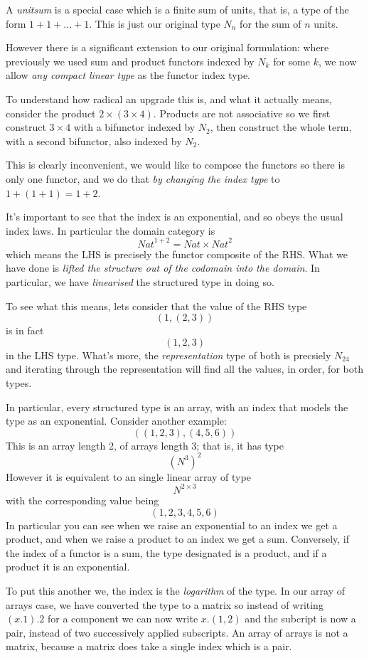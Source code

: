 \documentclass[oneside]{book}
\theoremstyle{plain}
\theoremstyle{definition}
\theoremstyle{plain}
\def\Nat{\mathit{Nat}}
\begin{document}
A {\em unitsum} is a special case which is a finite sum of units,
that is, a type of the form $1+1+...+1$. This is just our
original type $N_n$ for the sum of $n$ units.

However there is a significant extension to our original formulation:
where previously we used sum and product functors indexed by
$N_k$ for some $k$, we now allow {\em any compact linear type}
as the functor index type.

To understand how radical an upgrade this is, and what it actually
means, consider the product $2 \times (3 \times 4)$. Products are
not associative so we first construct $3\times4$ with a bifunctor
indexed by $N_2$, then construct the whole term, with a second
bifunctor, also indexed by $N_2$.

This is clearly inconvenient, we would like to compose the functors
so there is only one functor, and we do that {\em by changing
the index type} to $1+(1+1) = 1 + 2$.

It's important to see that the index is an exponential, and so obeys the
usual index laws. In particular the domain category is
$$\Nat^{1+2} = \Nat \times {\Nat^2}$$
which means the LHS is precisely the functor composite of the RHS.
What we have done is {\em lifted the structure out of the codomain
into the domain}. In particular, we have {\em linearised} the
structured type in doing so.

To see what this means, lets consider that the value of the RHS type
$$(1,(2,3))$$
is in fact
$$(1,2,3)$$
in the LHS type. What's more, the {\em representation} type of both
is precsiely $N_{24}$ and iterating through the representation will
find all the values, in order, for both types.

In particular, every structured type is an array, with an index
that models the type as an exponential. Consider another example:
$$((1,2,3),(4,5,6))$$
This is an array length 2, of arrays length 3; that is, it has type
$$(N^3)^2$$
However it is equivalent to an single linear array
of type
$$N^{2\times 3}$$
with the corresponding value being
$$(1,2,3,4,5,6)$$
In particular you can see when we raise an exponential to an index
we get a product, and when we raise a product to an index we get a sum.
Conversely, if the index of a functor is a sum, the type designated
is a product, and if a product it is an exponential.

To put this another we, the index is the {\em logarithm} of the type.
In our array of arrays case, we have converted the type to a matrix
so instead of writing $(x.1).2$ for a component we can now
write $x.(1,2)$ and the subcript is now a pair, instead of two
successively applied subscripts. An array of arrays is not a matrix,
because a matrix does take a single index which is a pair.
\end{document}
